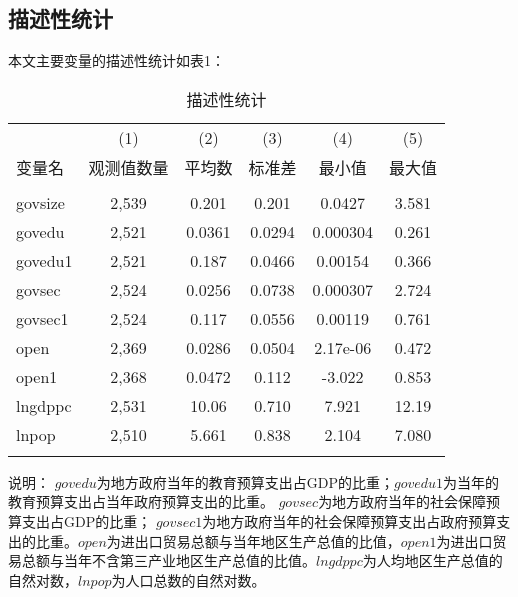 \documentclass[10pt]{article}
\begin{document}
\subsection{描述性统计}
本文主要变量的描述性统计如表1：
    \begin{table}
        \begin{center}
            \caption{描述性统计}
            \begin{threeparttable}
            \begin{tabular}{lccccc} \hline \hline
                 & (1) & (2) & (3) & (4) & (5) \\
                变量名 & 观测值数量 & 平均数 & 标准差 & 最小值 & 最大值 \\ \hline
                 &  &  &  &  &  \\
                govsize & 2,539 & 0.201 & 0.201 & 0.0427 & 3.581 \\
                govedu & 2,521 & 0.0361 & 0.0294 & 0.000304 & 0.261 \\
                govedu1 & 2,521 & 0.187 & 0.0466 & 0.00154 & 0.366 \\
                govsec & 2,524 & 0.0256 & 0.0738 & 0.000307 & 2.724 \\
                govsec1 & 2,524 & 0.117 & 0.0556 & 0.00119 & 0.761 \\
                open & 2,369 & 0.0286 & 0.0504 & 2.17e-06 & 0.472 \\
                open1 & 2,368 & 0.0472 & 0.112 & -3.022 & 0.853 \\
                lngdppc & 2,531 & 10.06 & 0.710 & 7.921 & 12.19 \\
                lnpop & 2,510 & 5.661 & 0.838 & 2.104 & 7.080 \\
                 &  &  &  &  &  \\ \hline \hline
            \end{tabular}

            \begin{tablenotes}
                \item 说明：
                $govedu$为地方政府当年的教育预算支出占GDP的比重；$govedu1$为当年的教育预算支出占当年政府预算支出的比重。
                 $govsec$为地方政府当年的社会保障预算支出占GDP的比重； $govsec1$为地方政府当年的社会保障预算支出占政府预算支出的比重。$open$为进出口贸易总额与当年地区生产总值的比值，$open1$为进出口贸易总额与当年不含第三产业地区生产总值的比值。$lngdppc$为人均地区生产总值的自然对数，$lnpop$为人口总数的自然对数。
            \end{tablenotes}
            \end{threeparttable}
        \end{center}
    \end{table}
\end{document}
